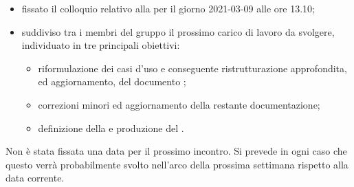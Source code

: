 
\begin{itemize}
    \item fissato il colloquio relativo alla  per il giorno 2021-03-09 alle ore 13.10;
    \item suddiviso tra i membri del gruppo il prossimo carico di lavoro da svolgere, individuato in tre principali obiettivi:
        \begin{itemize}
            \item riformulazione dei casi d'uso e conseguente ristrutturazione approfondita, ed aggiornamento, del documento \AdRv{};
            \item correzioni minori ed aggiornamento della restante documentazione;
            \item definizione della  e produzione del .
        \end{itemize}
\end{itemize}

Non è stata fissata una data per il prossimo incontro. Si prevede in ogni caso che questo verrà probabilmente svolto nell'arco della prossima settimana rispetto alla data corrente.